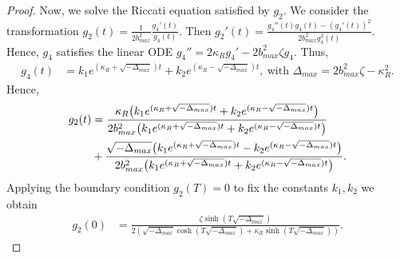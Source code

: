 \documentclass[12,reqno]{amsart}
\numberwithin{equation}{section}
\begin{document}
\begin{proof}
	Now, we solve the Riccati equation satisfied by $g_{2}$. We consider the transformation $g_{2}(t)=\frac{1}{2b_{max}^{2}}\frac{g_{4}'(t)}{g_{4}(t)}$. Then $g_{2}'(t)=\frac{g_{4}''(t)g_{4}(t)-(g_{4}'(t))^2}{2b_{max}^{2}g_{4}^{2}(t)}$. Hence, $g_{4}$ satisfies the linear ODE $g_{4}''=2\kappa_{R}g_{4}'-2b_{max}^{2}\zeta g_{4}$. Thus,
	\begin{align}
		g_{4}(t)&=k_{1}e^{(\kappa_{R}+\sqrt{-\Delta_{max}})t}+k_{2}e^{(\kappa_{R}-\sqrt{-\Delta_{max}})t},~\text{with } \Delta_{max}=2b_{max}^{2}\zeta-\kappa_{R}^{2}.
	\end{align}
	Hence,
	\begin{align}\label{E2_Lemma B3}
		g_{2}(t)&=\frac{\kappa_{R}\big(k_{1}e^{(\kappa_{R}+\sqrt{-\Delta_{max}})t}+k_{2}e^{(\kappa_{R}-\sqrt{-\Delta_{max}})t}\big)}{2b_{max}^{2}\big(k_{1}e^{(\kappa_{R}+\sqrt{-\Delta_{max}})t}+k_{2}e^{(\kappa_{R}-\sqrt{-\Delta_{max}})t}\big)}\notag\\
		&+\frac{\sqrt{-\Delta_{max}}\big(k_{1}e^{(\kappa_{R}+\sqrt{-\Delta_{max}})t}-k_{2}e^{(\kappa_{R}-\sqrt{-\Delta_{max}})t}\big)}{2b_{max}^{2}\big(k_{1}e^{(\kappa_{R}+\sqrt{-\Delta_{max}})t}+k_{2}e^{(\kappa_{R}-\sqrt{-\Delta_{max}})t}\big)}.
	\end{align}
	Applying the boundary condition $g_{2}(T)=0$ to fix the constants $k_{1},k_{2}$ we obtain
	\begin{align}
		g_{2}(0)&=\frac{\zeta\sinh(T\sqrt{-\Delta_{max}})}{2\left(\sqrt{-\Delta_{max}}\cosh(T\sqrt{-\Delta_{max}})+\kappa_{R}\sinh(T\sqrt{-\Delta_{max}})\right)}.
	\end{align}
	

\end{proof}
\end{document}
